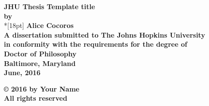 \documentclass[12pt]{report}
\begin{document}
\newcommand{\bm}[1]{ \mbox{\boldmath $ #1 $} }
\newcommand{\bin}[2]{\left(\begin{array}{@{}c@{}} #1 \\ #2
             \end{array}\right) }
\renewcommand{\contentsname}{Table of Contents}
\baselineskip=24pt
 
\thispagestyle{empty}
\begin{center}
\vspace*{.25in}
{\bf\LARGE{ JHU Thesis Template title }}\\ %
\vspace*{.75in}
{\bf by} \\*[18pt]
\vspace*{.2in}
{\bf Alice Cocoros}\\ %
\vspace*{1in}
{\bf A dissertation submitted to The Johns Hopkins University\\
in conformity with the requirements for the degree of\\
Doctor of Philosophy }\\
\vspace*{.75in}
{\bf Baltimore, Maryland} \\
{\bf June, 2016} \\     %
\vspace*{.5in}
\begin{small}
{\bf \copyright{ }2016 by Your Name} \\ %
{\bf All rights reserved}
\end{small}
\end{center}
\newpage 

\pagestyle{plain}
\setcounter{page}{2}




\pagestyle{plain}
\baselineskip=24pt
\tableofcontents
\listoftables
\listoffigures
\end{document}
